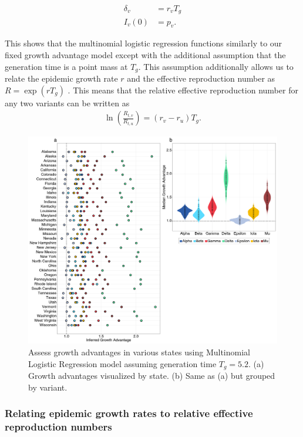 \documentclass[11pt,oneside,letterpaper]{article}
\begin{document}
\begin{align}
  \delta_{v} &= r_{v}T_{g}\\
  I_{v}(0) &= p_{v}.
\end{align}

This shows that the multinomial logistic regression functions similarly to our fixed growth advantage model except with the additional assumption that the generation time is a point mass at $T_{g}$.
This assumption additionally allows us to relate the epidemic growth rate $r$ and the effective reproduction number as $R = \exp(r T_{g})$ \cite{Wallinga2006}. This means that the relative effective reproduction number for any two variants can be written as
\begin{align*}
\ln \left( \frac{R_{t,v}}{R_{t,u}} \right) = (r_{v} - r_{u}) T_{g}.
\end{align*}

\begin{figure}
  \centering
  \includegraphics[width=\linewidth]{figs/fig_MLR_growth_advantages_supp.png}
  \caption{Assess growth advantages in various states using Multinomial Logistic Regression model assuming generation time $T_{g} = 5.2$.
  (a) Growth advantages visualized by state.
  (b) Same as (a) but grouped by variant.}%
  \label{fig:MLR_growth_advantages}
\end{figure}

\newpage

\subsubsection*{Relating epidemic growth rates to relative effective reproduction numbers}
\end{document}

